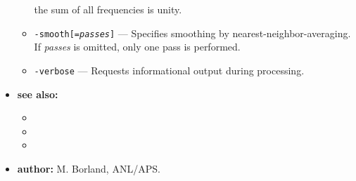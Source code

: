 \begin{itemize}
\begin{itemize}
        the sum of all frequencies is unity.
    \item {\tt -smooth[={\em passes}]} --- Specifies smoothing by nearest-neighbor-averaging.  If {\em passes}
        is omitted, only one pass is performed.
    \item {\tt -verbose} --- Requests informational output during processing.
    \end{itemize}
\item {\bf see also:}
    \begin{itemize}
    \item {}
    \item {}
    \item {}
    \end{itemize}
\item {\bf author:} M. Borland, ANL/APS.
\end{itemize}
